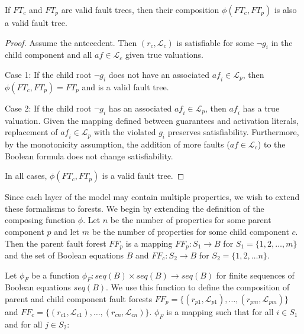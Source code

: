 \begin{lemma} If $\mathit{FT}_c$ and $\mathit{FT}_p$ are valid fault trees, then their composition $\phi(\mathit{FT}_c, \mathit{FT}_p)$ is also a valid fault tree. 
\begin{proof}
Assume the antecedent. Then $(r_c, \mathcal{L}_c)$ is satisfiable for some $\neg g_i$ in the child component and all $\mathit{af} \in \mathcal{L}_c$ given true valuations. 

Case 1: If the child root $\neg g_i$ does not have an associated $\mathit{af_i} \in \mathcal{L}_p$, then $\phi(\mathit{FT}_c, \mathit{FT}_p) = \mathit{FT}_p$ and is a valid fault tree.

Case 2: If the child root $\neg g_i$ has an associated $\mathit{af_i} \in \mathcal{L}_p$, then $\mathit{af_i}$ has a true valuation. Given the mapping defined between guarantees and activation literals, replacement of $\mathit{af_i} \in \mathcal{L}_p$ with the violated $g_i$ preserves satisfiability. Furthermore, by the monotonicity assumption, the addition of more faults ($\mathit{af} \in \mathcal{L}_c$) to the Boolean formula does not change satisfiability. 

In all cases, $\phi(\mathit{FT}_c, \mathit{FT}_p)$ is a valid fault tree. 
\end{proof}
\label{lemma:validTree}
\end{lemma}

Since each layer of the model may contain multiple properties, we wish to extend these formalisms to forests. We begin by extending the definition of the composing function $\phi$. Let $n$ be the number of properties for some parent component $p$ and let $m$ be the number of properties for some child component $c$. Then the parent fault forest $\mathit{FF}_p$ is a mapping $\mathit{FF}_p : S_1 \rightarrow B$ for $S_1 = \{1,2,\dots,m\}$ and the set of Boolean equations $B$ and $\mathit{FF}_c: S_2 \rightarrow B$ for $S_2 = \{1,2,\dots n\}$. 

Let $\phi_F$ be a function $\phi _F: \mathit{seq(B)} \times \mathit{seq(B)} \rightarrow \mathit{seq(B)}$ for finite sequences of Boolean equations $\mathit{seq(B)}$. We use this function to define the composition of parent and child component fault forests $\mathit{FF}_p = \{(r_{p1},\mathcal{L}_{p1}), \dots, (r_ {pm}, \mathcal{L}_{pm})\}$ and $\mathit{FF}_c = \{(r_{c1},\mathcal{L}_{c1}), \dots, (r_ {cn}, \mathcal{L}_{cn})\}$. $\phi_F$ is a mapping such that for all $i \in S_1$ and for all $j \in S_2$: 

